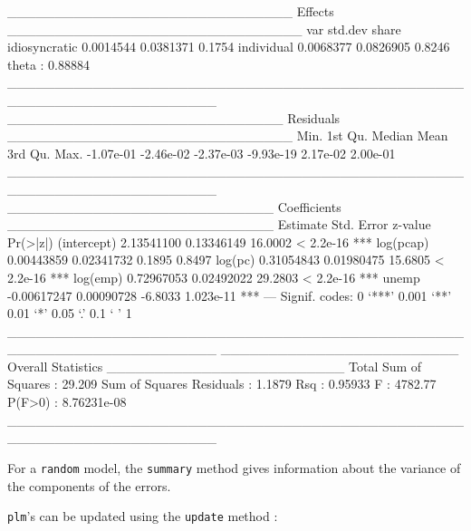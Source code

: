 \documentclass{article}
\begin{document}
\begin{Schunk}
\begin{Soutput}
______________________________ Effects _______________________________
                    var   std.dev  share
idiosyncratic 0.0014544 0.0381371 0.1754
individual    0.0068377 0.0826905 0.8246
theta   :  0.88884  
______________________________________________________________________ 
_____________________________ Residuals ______________________________
     Min.   1st Qu.    Median      Mean   3rd Qu.      Max. 
-1.07e-01 -2.46e-02 -2.37e-03 -9.93e-19  2.17e-02  2.00e-01 
______________________________________________________________________ 
____________________________ Coefficients ____________________________
               Estimate  Std. Error z-value  Pr(>|z|)    
(intercept)  2.13541100  0.13346149 16.0002 < 2.2e-16 ***
log(pcap)    0.00443859  0.02341732  0.1895    0.8497    
log(pc)      0.31054843  0.01980475 15.6805 < 2.2e-16 ***
log(emp)     0.72967053  0.02492022 29.2803 < 2.2e-16 ***
unemp       -0.00617247  0.00090728 -6.8033 1.023e-11 ***
---
Signif. codes:  0 ‘***’ 0.001 ‘**’ 0.01 ‘*’ 0.05 ‘.’ 0.1 ‘ ’ 1 
______________________________________________________________________ 
_________________________ Overall Statistics _________________________
Total Sum of Squares       : 29.209
Sum of Squares Residuals   : 1.1879
Rsq                        : 0.95933
F                          : 4782.77
P(F>0)                     : 8.76231e-08
______________________________________________________________________ 
\end{Soutput}
\end{Schunk}

For a \texttt{random} model, the \texttt{summary} method gives
information about the variance of the components of the errors.

\texttt{plm}'s can be updated using the \texttt{update} method :
\end{document}
